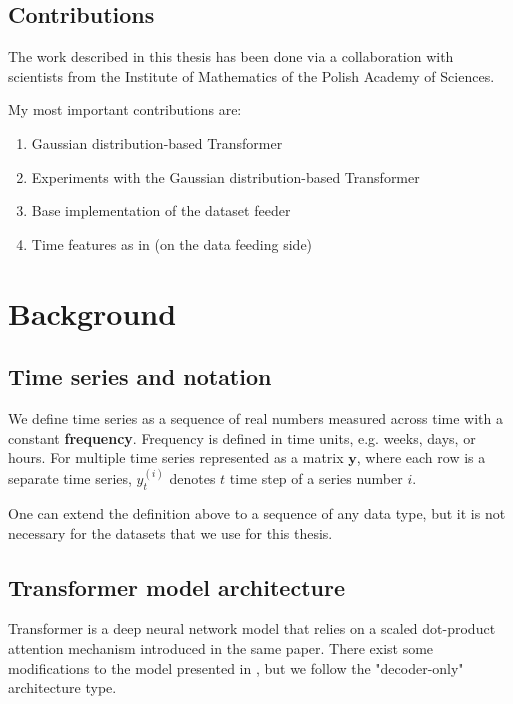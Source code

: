 \documentclass[en]{pracamgr}
\begin{document}
	
	\section*{Contributions}\label{r:contributions}
	
	The work described in this thesis has been done via a collaboration with scientists from the Institute of Mathematics of the Polish Academy of Sciences.
	
	My most important contributions are:
	\begin{enumerate}
		\item Gaussian distribution-based Transformer
		\item Experiments with the Gaussian distribution-based Transformer
		\item Base implementation of the dataset feeder
		\item Time features as in \cite{enhancing} (on the data feeding side)
	\end{enumerate}
	
	\chapter{Background}\label{r:background}
	
	\section{Time series and notation}
	
	We define time series as a sequence of real numbers measured across time with a constant \textbf{frequency}. Frequency is defined in time units, e.g. weeks, days, or hours. For multiple time series represented as a matrix $\textbf{y}$, where each row is a separate time series, $y^{(i)}_t$ denotes $t$ time step of a series number $i$.
	
	One can extend the definition above to a sequence of any data type, but it is not necessary for the datasets that we use for this thesis.
	
	
	\section{Transformer model architecture}\label{s:architecture}
	
	Transformer \cite{tr} is a deep neural network model that relies on a scaled dot-product attention mechanism introduced in the same paper. There exist some modifications to the model presented in \cite{tr}, but we follow the "decoder-only" \cite{wikipedia} architecture type.
	
\end{document}
